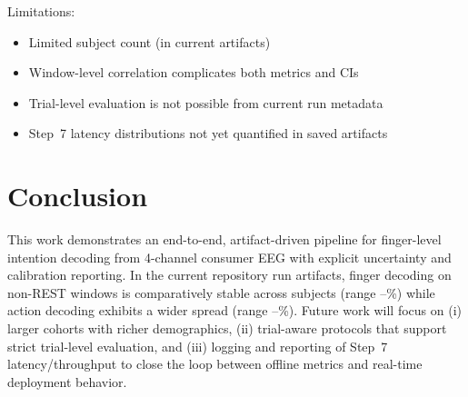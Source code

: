 \documentclass[conference]{IEEEtran}
\begin{document}
Limitations:
\begin{itemize}
\item Limited subject count (\NumSubjects in current artifacts)
\item Window-level correlation complicates both metrics and CIs
\item Trial-level evaluation is not possible from current run metadata
\item Step~7 latency distributions not yet quantified in saved artifacts
\end{itemize}

\section{Conclusion}

This work demonstrates an end-to-end, artifact-driven pipeline for finger-level intention decoding from 4-channel consumer EEG with explicit uncertainty and calibration reporting. In the current repository run artifacts, finger decoding on non-REST windows is comparatively stable across subjects (range \FingerAccMin--\FingerAccMax\%) while action decoding exhibits a wider spread (range \ActionAccMin--\ActionAccMax\%). Future work will focus on (i) larger cohorts with richer demographics, (ii) trial-aware protocols that support strict trial-level evaluation, and (iii) logging and reporting of Step~7 latency/throughput to close the loop between offline metrics and real-time deployment behavior.



\end{document}
